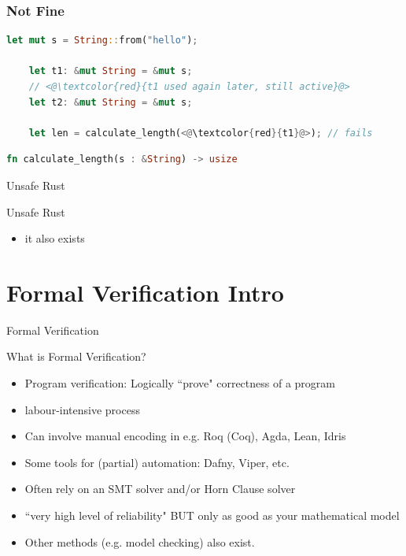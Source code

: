 \documentclass{beamer}
\begin{document}
\begin{frame}[fragile]
\frametitle{Not Fine}
\begin{block}{}
\begin{lstlisting}[language=Rust]
    let mut s = String::from("hello");
    
    let t1: &mut String = &mut s;
    // <@\textcolor{red}{t1 used again later, still active}@>
    let t2: &mut String = &mut s;

    let len = calculate_length(<@\textcolor{red}{t1}@>); // fails
 \end{lstlisting}
\end{block}
\begin{lstlisting}[language=Rust]
fn calculate_length(s : &String) -> usize
\end{lstlisting}
\end{frame}




\begin{frame}{Unsafe Rust}
\begin{block}{Unsafe Rust}
\begin{itemize} 
	\item it also exists
\end{itemize} 
\end{block}
\end{frame}


\section{Formal Verification Intro}
\begin{frame}{Formal Verification}
\begin{block}{What is Formal Verification?}
\begin{itemize} 
	\item Program verification: Logically ``prove" correctness of a program
	\item labour-intensive process
	\item Can involve manual encoding in e.g. Roq (Coq), Agda, Lean, Idris
	\item Some tools for (partial) automation: Dafny, Viper, etc.
	\item Often rely on an SMT solver and/or Horn Clause solver
	\item ``very high level of reliability" BUT only as good as your mathematical model 
	\item Other methods (e.g. model checking) also exist.
\end{itemize} 
\end{block}
\end{frame}
\end{document}
